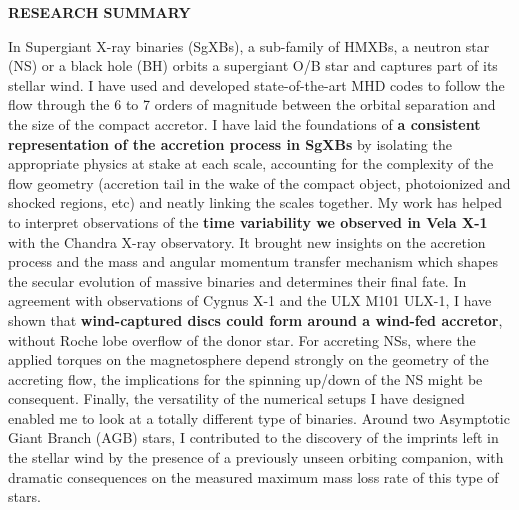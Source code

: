 \documentclass[12pt,onecolumn]{article}
\makeatletter
\newcommand{\sgx}{SgXB\xspace}
\newcommand{\sgxs}{SgXBs\xspace}
\newcommand{\ulx}{ULX\xspace}
\newcommand*{\hmxbs}{HMXBs\@\xspace}
\newcommand*{\ns}{NS\@\xspace}
\newcommand*{\nss}{NSs\@\xspace}
\newcommand*{\bh}{BH\@\xspace}
\makeatother
\begin{document}
\newpage

\vspace*{-1.2cm}
\begin{center}
\Large \textbf{RESEARCH SUMMARY}\\
\end{center}
\normalfont

In Supergiant X-ray binaries (\sgxs), a sub-family of \hmxbs, a neutron star (\ns) or a black hole (\bh) orbits a supergiant O/B star and captures part of its stellar wind. I have used and developed state-of-the-art MHD codes to follow the flow through the 6 to 7 orders of magnitude between the orbital separation and the size of the compact accretor. I have laid the foundations of \textbf{a consistent representation of the accretion process in \sgxs} by isolating the appropriate physics at stake at each scale, accounting for the complexity of the flow geometry (accretion tail in the wake of the compact object, photoionized and shocked regions, etc) and neatly linking the scales together. My work has helped to interpret observations of the \textbf{time variability we observed in Vela X-1} with the Chandra X-ray observatory. It brought new insights on the accretion process and the mass and angular momentum transfer mechanism which shapes the secular evolution of massive binaries and determines their final fate. In agreement with observations of Cygnus X-1 and the \ulx M101 ULX-1, I have shown that \textbf{wind-captured discs could form around a wind-fed accretor}, without Roche lobe overflow of the donor star. For accreting \nss, where the applied torques on the magnetosphere depend strongly on the geometry of the accreting flow, the implications for the spinning up/down of the \ns might be consequent. Finally, the versatility of the numerical setups I have designed enabled me to look at a totally different type of binaries. Around two Asymptotic Giant Branch (AGB) stars, I contributed to the discovery of the imprints left in the stellar wind by the presence of a previously unseen orbiting companion, with dramatic consequences on the measured maximum mass loss rate of this type of stars.

\end{document}
